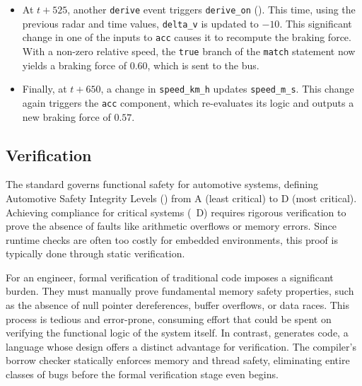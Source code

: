 \begin{itemize}
  \item At $t+525$, another \texttt{derive} event triggers \texttt{derive\_on}
        (). This time, using the previous radar and
        time values, \texttt{delta\_v} is updated to $-10$. This significant change in one of
        the inputs to \texttt{acc} causes it to recompute the braking force. With a non-zero
        relative speed, the \texttt{true} branch of the \texttt{match} statement now yields a
        braking force of $0.60$, which is sent to the bus.

  \item Finally, at $t+650$, a change in \texttt{speed\_km\_h} updates \texttt{speed\_m\_s}.
        This change again triggers the \texttt{acc} component, which re-evaluates its logic
        and outputs a new braking force of $0.57$.
\end{itemize}

\subsection{Verification}
\label{sec:grust:example:greusot}

The \iso standard governs functional safety for automotive systems, defining Automotive Safety
Integrity Levels (\Asil) from A (least critical) to D (most critical). Achieving compliance for
critical systems (\Asil~D) requires rigorous verification to prove the absence of faults like
arithmetic overflows or memory errors. Since runtime checks are often too costly for embedded
environments, this proof is typically done through static verification.

For an engineer, formal verification of traditional \Ci code imposes a significant burden. They must
manually prove fundamental memory safety properties, such as the absence of null pointer
dereferences, buffer overflows, or data races. This process is tedious and error-prone, consuming
effort that could be spent on verifying the functional logic of the system itself. In contrast,
\GRust generates \Rust code, a language whose design offers a distinct advantage for verification.
The \Rust compiler's borrow checker statically enforces memory and thread safety, eliminating entire
classes of bugs before the formal verification stage even begins.

